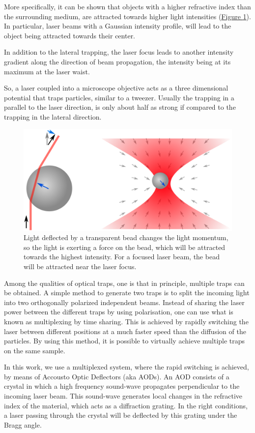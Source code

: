 \documentclass[A4paperpaper,11pt,english]{sphinxmanual}
\begin{document}
More specifically, it can be shown that objects with a higher refractive
index than the surrounding medium, are attracted towards higher light intensities
(\hyperref[index-latex:setup]{Figure  \ref*{index-latex:setup}}).  In particular, laser beams with a Gaussian intensity
profile, will lead to the object being attracted towards their center.

In addition to the lateral trapping, the laser focus leads to
another intensity gradient along the direction of beam propagation, the intensity being at its maximum at the laser waist.

So, a laser coupled into a microscope objective acts as a three dimensional
potential that traps particles, similar to a tweezer. Usually the trapping in
a parallel to the laser direction, is only about half as strong if compared to the trapping in the
lateral direction.
\begin{figure}[htbp]
\centering
\capstart

\includegraphics[width=0.700\linewidth]{ot1.png}
\caption{Light deflected by a transparent bead changes the light momentum, so the
light is exerting a force on the bead, which will be attracted towards
the highest intensity.  For a focused laser beam, the bead will be attracted
near the laser focus.}\label{index-latex:setup}\end{figure}

Among the qualities of optical traps, one is that in principle, multiple traps can be
obtained. A simple method to generate two traps is to split the incoming light
into two orthogonally polarized independent beams.  Instead of sharing the
laser power between the different traps by using polarisation, one can use what
is known as multiplexing by time sharing. This is achieved by rapidly switching the laser
between different positions at a much faster speed than the diffusion of the particles. By using this method,
it is possible to virtually achieve multiple traps on the same
sample.

In this work, we use a multiplexed system, where the rapid switching is achieved, by means of Accousto Optic Deflectors
(aka AODs).  An AOD consists of a crystal in which a high frequency
sound-wave propagates perpendicular to the incoming laser beam. This sound-wave generates local changes in the
refractive index of the material, which acts as a diffraction grating. In
the right conditions, a laser passing through the crystal will
be deflected by this grating under the Bragg angle.
\end{document}
